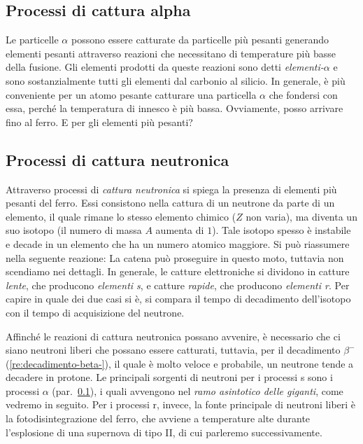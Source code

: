 \subsection{Processi di cattura alpha}\label{sec:cattura-alpha}
Le particelle $\alpha$ possono essere catturate da particelle più pesanti generando elementi pesanti attraverso reazioni che necessitano di temperature più basse della fusione. Gli elementi prodotti da queste reazioni sono detti \emph{elementi-$\alpha$} e sono sostanzialmente tutti gli elementi dal carbonio al silicio. In generale, è più conveniente per un atomo pesante catturare una particella $\alpha$ che fondersi con essa, perché la temperatura di innesco è più bassa. Ovviamente, posso arrivare fino al ferro. E per gli elementi più pesanti?

\subsection{Processi di cattura neutronica}
Attraverso processi di \emph{cattura neutronica} si spiega la presenza di elementi più pesanti del ferro. Essi consistono nella cattura di un neutrone da parte di un elemento, il quale rimane lo stesso elemento chimico ($Z$ non varia), ma diventa un suo isotopo (il numero di massa $A$ aumenta di $1$). Tale isotopo spesso è instabile e decade in un elemento che ha un numero atomico maggiore. Si può riassumere nella seguente reazione:
La catena può proseguire in questo moto, tuttavia non scendiamo nei dettagli. In generale, le catture elettroniche si dividono in catture \emph{lente}, che producono \emph{elementi s}, e catture \emph{rapide}, che producono \emph{elementi r}. Per capire in quale dei due casi si è, si compara il tempo di decadimento dell'isotopo con il tempo di acquisizione del neutrone. 

Affinché le reazioni di cattura neutronica possano avvenire, è necessario che ci siano neutroni liberi che possano essere catturati, tuttavia, per il decadimento $\beta^-$ (\ref{re:decadimento-beta-}), il quale è molto veloce e probabile, un neutrone tende a decadere in protone.  Le principali sorgenti di neutroni per i processi s sono i processi $\alpha$ (par.~\ref{sec:cattura-alpha}), i quali avvengono nel \emph{ramo asintotico delle giganti}, come vedremo in seguito. Per i processi r, invece, la fonte principale di neutroni liberi è la fotodisintegrazione del ferro, che avviene a temperature alte durante l'esplosione di una supernova di tipo II, di cui parleremo successivamente. 


